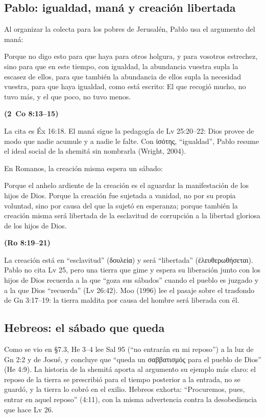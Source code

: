 \documentclass[11pt,letterpaper]{article}
\newcommand{\grc}[1]{\foreignlanguage{ancientgreek}{#1}}
\newcommand{\fuente}[1]{\par\hfill{\upshape\bfseries\small\textcolor{tierraroja}{#1}}}
\begin{document}
\subsection{Pablo: igualdad, maná y creación libertada}
Al organizar la colecta para los pobres de Jerusalén, Pablo usa el argumento del maná:

\begin{cita}Porque no digo esto para que haya para otros holgura, y para vosotros estrechez, sino para que en este tiempo, con igualdad, la abundancia vuestra supla la escasez de ellos, para que también la abundancia de ellos supla la necesidad vuestra, para que haya igualdad, como está escrito: El que recogió mucho, no tuvo más, y el que poco, no tuvo menos.\fuente{(2~Co 8:13--15)}\end{cita}

La cita es Éx 16:18. El maná sigue la pedagogía de Lv 25:20--22: Dios provee de modo que nadie acumule y a nadie le falte. Con \grc{ἰσότης}, ``igualdad'', Pablo resume el ideal social de la shemitá sin nombrarla (Wright, 2004).

En Romanos, la creación misma espera un sábado:

\begin{cita}Porque el anhelo ardiente de la creación es el aguardar la manifestación de los hijos de Dios. Porque la creación fue sujetada a vanidad, no por su propia voluntad, sino por causa del que la sujetó en esperanza; porque también la creación misma será libertada de la esclavitud de corrupción a la libertad gloriosa de los hijos de Dios.\fuente{(Ro 8:19--21)}\end{cita}

La creación está en ``esclavitud'' (\grc{δουλεία}) y será ``libertada'' (\grc{ἐλευθερωθήσεται}). Pablo no cita Lv 25, pero una tierra que gime y espera su liberación junto con los hijos de Dios recuerda a la que ``goza sus sábados'' cuando el pueblo es juzgado y a la que Dios ``recuerda'' (Lv 26:42). Moo (1996) lee el pasaje sobre el trasfondo de Gn 3:17--19: la tierra maldita por causa del hombre será liberada con él.

\subsection{Hebreos: el sábado que queda}
Como se vio en §7.3, He 3--4 lee Sal 95 (``no entrarán en mi reposo'') a la luz de Gn 2:2 y de Josué, y concluye que ``queda un \grc{σαββατισμός} para el pueblo de Dios'' (He 4:9). La historia de la shemitá aporta al argumento su ejemplo más claro: el reposo de la tierra se prescribió para el tiempo posterior a la entrada, no se guardó, y la tierra lo cobró en el exilio. Hebreos exhorta: ``Procuremos, pues, entrar en aquel reposo'' (4:11), con la misma advertencia contra la desobediencia que hace Lv 26.
\end{document}

